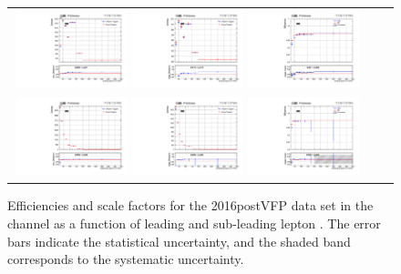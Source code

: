 {\begin{figure}[h]
  \begin{center}
    \begin{tabular}{ccc}
      \includegraphics[width=0.32\textwidth]{fig_2016postVFP_TrigSF/g_lepApt_ee_MC.pdf}
      \includegraphics[width=0.32\textwidth]{fig_2016postVFP_TrigSF/g_lepApt_ee_data.pdf}
      \includegraphics[width=0.32\textwidth]{fig_2016postVFP_TrigSF/g_ee_lepApt_FullSystUncBand.pdf}\\
      \includegraphics[width=0.32\textwidth]{fig_2016postVFP_TrigSF/g_lepBpt_ee_MC.pdf}
      \includegraphics[width=0.32\textwidth]{fig_2016postVFP_TrigSF/g_lepBpt_ee_data.pdf}
      \includegraphics[width=0.32\textwidth]{fig_2016postVFP_TrigSF/g_ee_lepBpt_FullSystUncBand.pdf}\\
    \end{tabular}
    \caption{Efficiencies and scale factors for the 2016postVFP data set in the \ee channel as a function of leading and sub-leading lepton \pT.
            The error bars indicate the statistical uncertainty, and the shaded band corresponds to the systematic uncertainty.
            }
    \label{TrigSF_2016postVFP_2}
  \end{center}
\end{figure}

}
